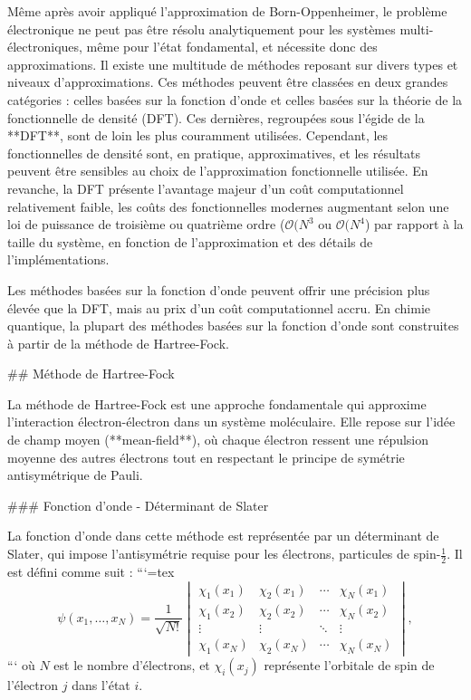 \documentclass[12pt,a4paper]{report}
\begin{document}
\begin{markdown}
Même après avoir appliqué l'approximation de Born-Oppenheimer, le problème électronique ne peut pas être résolu analytiquement pour les systèmes multi-électroniques, même pour l'état fondamental, et nécessite donc des approximations. Il existe une multitude de méthodes reposant sur divers types et niveaux d'approximations. Ces méthodes peuvent être classées en deux grandes catégories : celles basées sur la fonction d'onde et celles basées sur la théorie de la fonctionnelle de densité (DFT). Ces dernières, regroupées sous l'égide de la **DFT**, sont de loin les plus couramment utilisées. Cependant, les fonctionnelles de densité sont, en pratique, approximatives, et les résultats peuvent être sensibles au choix de l'approximation fonctionnelle utilisée. En revanche, la DFT présente l'avantage majeur d'un coût computationnel relativement faible, les coûts des fonctionnelles modernes augmentant selon une loi de puissance de troisième ou quatrième ordre ($\mathcal{O}(N^3$ ou $\mathcal{O}(N^4$) par rapport à la taille du système, en fonction de l'approximation et des détails de l'implémentations.

Les méthodes basées sur la fonction d'onde peuvent offrir une précision plus élevée que la DFT, mais au prix d'un coût computationnel accru. En chimie quantique, la plupart des méthodes basées sur la fonction d'onde sont construites à partir de la méthode de Hartree-Fock.

## Méthode de Hartree-Fock

La méthode de Hartree-Fock est une approche fondamentale qui approxime l’interaction électron-électron dans un système moléculaire. Elle repose sur l'idée de champ moyen (**mean-field**), où chaque électron ressent une répulsion moyenne des autres électrons tout en respectant le principe de symétrie antisymétrique de Pauli.

### Fonction d'onde - Déterminant de Slater

La fonction d'onde dans cette méthode est représentée par un déterminant de Slater, qui impose l'antisymétrie requise pour les électrons, particules de spin-\(\frac{1}{2}\). Il est défini comme suit :
```{=tex}
\[
\psi(x_1, \ldots, x_N) = \frac{1}{\sqrt{N!}}
\begin{vmatrix}
\chi_1(x_1) & \chi_2(x_1) & \cdots & \chi_N(x_1) \\
\chi_1(x_2) & \chi_2(x_2) & \cdots & \chi_N(x_2) \\
\vdots & \vdots & \ddots & \vdots \\
\chi_1(x_N) & \chi_2(x_N) & \cdots & \chi_N(x_N)
\end{vmatrix} ,
\]
```
où \(N\) est le nombre d'électrons, et \(\chi_i(x_j)\) représente l'orbitale de spin de l'électron \(j\) dans l'état \(i\).


\end{markdown}
\end{document}
